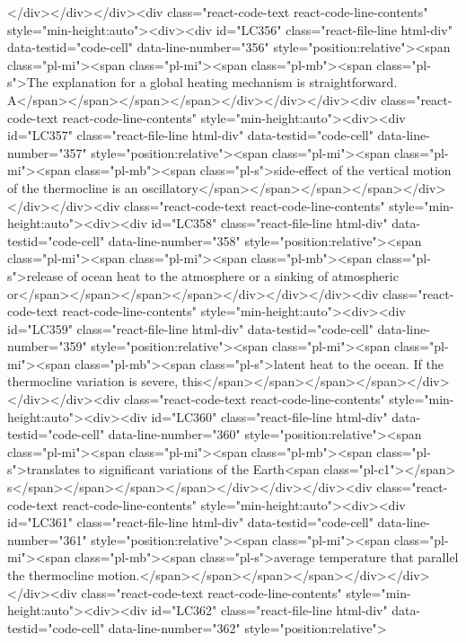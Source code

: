 {{{{</div></div></div><div class="react-code-text react-code-line-contents" style="min-height:auto"><div><div id="LC356" class="react-file-line html-div" data-testid="code-cell" data-line-number="356" style="position:relative"><span class="pl-mi"><span class="pl-mi"><span class="pl-mb"><span class="pl-s">The explanation for a global heating mechanism is straightforward. A</span></span></span></span></div></div></div><div class="react-code-text react-code-line-contents" style="min-height:auto"><div><div id="LC357" class="react-file-line html-div" data-testid="code-cell" data-line-number="357" style="position:relative"><span class="pl-mi"><span class="pl-mi"><span class="pl-mb"><span class="pl-s">side-effect of the vertical motion of the thermocline is an oscillatory</span></span></span></span></div></div></div><div class="react-code-text react-code-line-contents" style="min-height:auto"><div><div id="LC358" class="react-file-line html-div" data-testid="code-cell" data-line-number="358" style="position:relative"><span class="pl-mi"><span class="pl-mi"><span class="pl-mb"><span class="pl-s">release of ocean heat to the atmosphere or a sinking of atmospheric or</span></span></span></span></div></div></div><div class="react-code-text react-code-line-contents" style="min-height:auto"><div><div id="LC359" class="react-file-line html-div" data-testid="code-cell" data-line-number="359" style="position:relative"><span class="pl-mi"><span class="pl-mi"><span class="pl-mb"><span class="pl-s">latent heat to the ocean. If the thermocline variation is severe, this</span></span></span></span></div></div></div><div class="react-code-text react-code-line-contents" style="min-height:auto"><div><div id="LC360" class="react-file-line html-div" data-testid="code-cell" data-line-number="360" style="position:relative"><span class="pl-mi"><span class="pl-mi"><span class="pl-mb"><span class="pl-s">translates to significant variations of the Earth<span class="pl-c1">\textquotesingle</span> s</span></span></span></span></div></div></div><div class="react-code-text react-code-line-contents" style="min-height:auto"><div><div id="LC361" class="react-file-line html-div" data-testid="code-cell" data-line-number="361" style="position:relative"><span class="pl-mi"><span class="pl-mi"><span class="pl-mb"><span class="pl-s">average temperature that parallel the thermocline motion.</span></span></span></span></div></div></div><div class="react-code-text react-code-line-contents" style="min-height:auto"><div><div id="LC362" class="react-file-line html-div" data-testid="code-cell" data-line-number="362" style="position:relative">
}}}}
